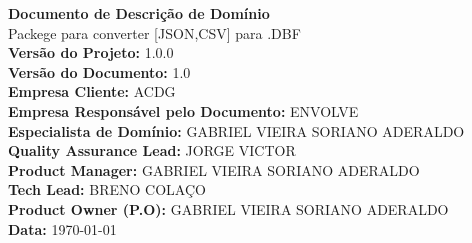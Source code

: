 \begin{titlepage}
    \centering
    \vfill
    {\Huge \textbf{Documento de Descrição de Domínio}}\\[1.5cm]
    {\Large Packege para converter [JSON,CSV] para .DBF}\\[1cm]
    \textbf{Versão do Projeto:} 1.0.0\\
    \textbf{Versão do Documento:} 1.0\\[1cm]
    \textbf{Empresa Cliente:} ACDG\\
    \textbf{Empresa Responsável pelo Documento:} ENVOLVE\\[1cm]
    \textbf{Especialista de Domínio:} GABRIEL VIEIRA SORIANO ADERALDO\\
    \textbf{Quality Assurance Lead:} JORGE VICTOR\\
    \textbf{Product Manager:} GABRIEL VIEIRA SORIANO ADERALDO\\
    \textbf{Tech Lead:} BRENO COLAÇO\\
    \textbf{Product Owner (P.O):} GABRIEL VIEIRA SORIANO ADERALDO\\[2cm]
    \textbf{Data:} \today\\
    \vfill
\end{titlepage}

